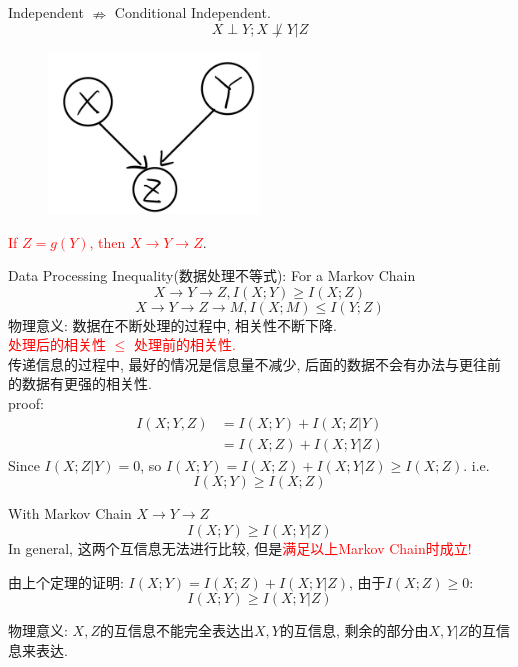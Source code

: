 \begin{proposition}
Independent $\nRightarrow$ Conditional Independent.
$$X\perp Y; X\not\perp Y|Z$$
\begin{figure}[htbp]
    \centering
    \includegraphics[width=0.5\textwidth]{./figures/chapter1/conditional_independent.png}
\end{figure}
\end{proposition}

\begin{proposition}
\textcolor{red}{If $Z=g(Y)$, then $X\rightarrow Y\rightarrow Z$}.
\end{proposition}

\begin{proposition}
Data Processing Inequality(数据处理不等式): For a Markov Chain $$X\rightarrow Y\rightarrow Z, I(X;Y)\geq I(X;Z)$$
$$X\rightarrow Y\rightarrow Z\rightarrow M, I(X;M)\leq I(Y;Z)$$
物理意义: 数据在不断处理的过程中, 相关性不断下降. \\
\textcolor{red}{处理后的相关性 $\leq$ 处理前的相关性.} \\
传递信息的过程中, 最好的情况是信息量不减少, 后面的数据不会有办法与更往前的数据有更强的相关性. \\
proof:
\begin{align*}
I(X;Y,Z) &= I(X;Y) + I(X;Z|Y) \\
&= I(X;Z) + I(X;Y|Z)
\end{align*}
Since $I(X;Z|Y)=0$, so $I(X;Y)=I(X;Z)+I(X;Y|Z)\geq I(X;Z)$.
i.e. $$I(X;Y)\geq I(X;Z)$$
\end{proposition}

\begin{proposition}
With Markov Chain $X\rightarrow Y\rightarrow Z$
$$I(X;Y)\geq I(X;Y|Z)$$
In general, 这两个互信息无法进行比较, 但是\textcolor{red}{满足以上Markov Chain时成立!}

由上个定理的证明: $I(X;Y)=I(X;Z)+I(X;Y|Z)$, 由于$I(X;Z)\geq 0$:
$$I(X;Y)\geq I(X;Y|Z)$$

物理意义: $X,Z$的互信息不能完全表达出$X,Y$的互信息, 剩余的部分由$X,Y|Z$的互信息来表达.

\end{proposition}


